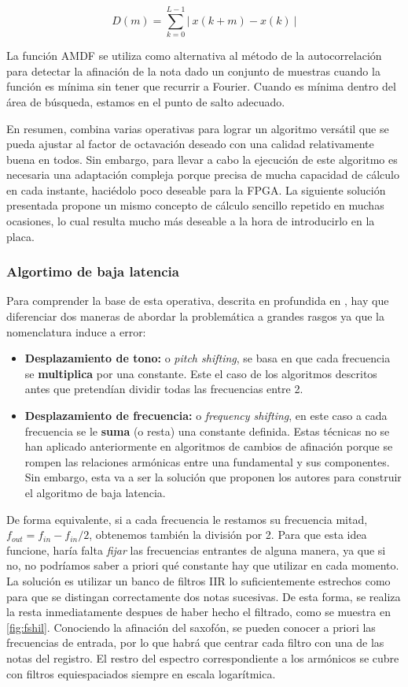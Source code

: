 \begin{equation}
\label{eq:amdf}
D(m) =  \sum_{k = 0}^{L - 1}|~x(k+m)-x(k)~|
\end{equation}

La función AMDF se utiliza como alternativa al método de la autocorrelación para detectar la afinación de la nota dado un conjunto de muestras cuando la función es mínima sin tener que recurrir a Fourier. Cuando es mínima dentro del área de búsqueda, estamos en el punto de salto adecuado. 

En resumen, combina varias operativas para lograr un algoritmo versátil que se pueda ajustar al factor de octavación deseado con una calidad relativamente buena en todos. Sin embargo, para llevar a cabo la ejecución de este algoritmo es necesaria una adaptación compleja porque precisa de mucha capacidad de cálculo en cada instante, haciédolo poco deseable para la FPGA. La siguiente solución presentada propone un mismo concepto de cálculo sencillo repetido en muchas ocasiones, lo cual resulta mucho más deseable a la hora de introducirlo en la placa.

\subsubsection{Algortimo de baja latencia}
\label{rhilbert}

Para comprender la base de esta operativa, descrita en profundida en \cite{hilbert}, hay que diferenciar dos maneras de abordar la problemática a grandes rasgos ya que la nomenclatura induce a error:
\begin{itemize}
\item \textbf{Desplazamiento de tono: }o \emph{pitch shifting}, se basa en que cada frecuencia se \textbf{multiplica} por una constante. Este el caso de los algoritmos descritos antes que pretendían dividir todas las frecuencias entre 2.
\item \textbf{Desplazamiento de frecuencia: }o \emph{frequency shifting}, en este caso a cada frecuencia se le \textbf{suma} (o resta) una constante definida. Estas técnicas no se han aplicado anteriormente en algoritmos de cambios de afinación porque se rompen las relaciones armónicas entre una fundamental y sus componentes. Sin embargo, esta va a ser la solución que proponen los autores para construir el algoritmo de baja latencia.
\end{itemize}
De forma equivalente, si a cada frecuencia le restamos su frecuencia mitad, $f_{out} = f_{in}-f_{in}/2$, obtenemos también la división por 2. Para que esta idea funcione, haría falta \emph{fijar} las frecuencias entrantes de alguna manera, ya que si no, no podríamos saber a priori qué constante hay que utilizar en cada momento. La solución es utilizar un banco de filtros IIR lo suficientemente estrechos como para que se distingan correctamente dos notas sucesivas. De esta forma, se realiza la resta inmediatamente despues de haber hecho el filtrado, como se muestra en \ref{fig:fshil}. Conociendo la afinación del saxofón, se pueden conocer a priori las frecuencias de entrada, por lo que habrá que centrar cada filtro con una de las notas del registro. El restro del espectro correspondiente a los armónicos se cubre con filtros equiespaciados siempre en escala logarítmica.

